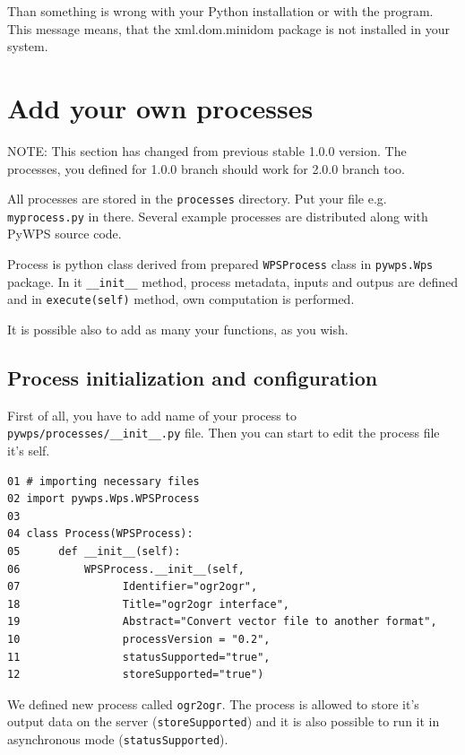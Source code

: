 \documentclass[a4paper,11pt]{article}
\newcommand{\note}[1]{\medskip{}\noindent{}NOTE: #1\medskip{}}
\begin{document}
     
Than something is wrong with your Python installation or with the program.
This message means, that the xml.dom.minidom package is not installed in
your system.
     


    
\section{Add your own processes}
\label{processes}
\note{This section has changed from previous stable 1.0.0 version. The
processes, you defined for 1.0.0 branch should work for 2.0.0 branch too.}
    
All processes are stored in the \texttt{processes} directory. Put your file
e.g. \texttt{myprocess.py} in there. Several example processes are
distributed along with PyWPS source code.
    
Process is python class derived from prepared \texttt{WPSProcess} class in
\texttt{pywps.Wps} package. In it \texttt{\_\_init\_\_} method,
process metadata, inputs and outpus are defined and in
\texttt{execute(self)} method, own computation is performed.


It is possible also to add as many your functions, as you wish.
    
\subsection{Process initialization and configuration}
First of all, you have to add name of your process to
\texttt{pywps/processes/\_\_init\_\_.py} file. Then you can start to edit
the process file it's self.

\begin{verbatim}
01 # importing necessary files
02 import pywps.Wps.WPSProcess
03 
04 class Process(WPSProcess):
05      def __init__(self):
06          WPSProcess.__init__(self,
07                Identifier="ogr2ogr",
18                Title="ogr2ogr interface",
19                Abstract="Convert vector file to another format",
10                processVersion = "0.2",
11                statusSupported="true",
12                storeSupported="true")
\end{verbatim}

We defined new process called \texttt{ogr2ogr}. The process is allowed to
store it's output data on the server (\texttt{storeSupported}) and it is also possible to run it in
asynchronous mode (\texttt{statusSupported}).
     
\end{document}
